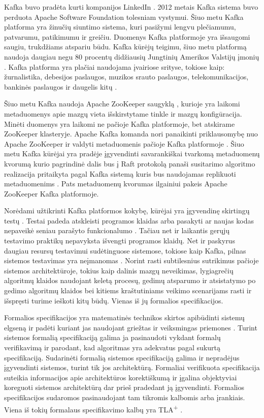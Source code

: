 \documentclass{VUMIFPSmagistrinis}
\begin{document}
 		Kafka buvo pradėta kurti kompanijos LinkedIn \cite{kfk}.
		2012 metais Kafka sistema buvo perduota Apache Software Foundation tolesniam vystymui.
		Šiuo metu Kafka platforma yra žinučių siuntimo sistema, kuri pasižymi lengvu plečiamumu, patvarumu, patikimumu ir greičiu.
		Duomenys Kafka platformoje yra išsaugomi saugiu, trukdžiams atspariu būdu.
		Kafka kūrėjų teigimu, šiuo metu platformą naudoja daugiau negu 80 procentų didžiausių Jungtinių Amerikos Valstijų įmonių \cite{kfk}.
		Kafka platforma yra plačiai naudojama įvairiose srityse, tokiose kaip: žurnalistika, debesijos paslaugos, muzikos srauto paslaugos, telekomunikacijos, bankinės paslaugos ir daugelis kitų \cite{kfk}.


		Šiuo metu Kafka naudoja Apache ZooKeeper saugyklą \cite{junqueira2013zookeeper}, kurioje yra laikomi metaduomenys apie mazgų vieta išskirstytame tinkle ir mazgų konfigūracija.
		Minėti duomenys yra laikomi ne pačioje Kafka platformoje, bet atskirame ZooKeeper klasteryje.
		Apache Kafka komanda nori panaikinti priklausomybę nuo Apache ZooKeeper ir valdyti metaduomenis pačioje Kafka platformoje \cite{metadata}.
		Šiuo metu Kafka kūrėjai yra pradėje įgyvendinti savarankiškai tvarkomą metaduomenų kvorumą kurio pagrindinė dalis bus į Raft protokolą panaši susitarimo algoritmo realizacija pritaikyta pagal Kafka sistemą kuris bus naudojamas replikuoti metaduomenims \cite{qourum}.
		Pats metaduomenų kvorumas ilgainiui pakeis Apache ZooKeeper Kafka platformoje.
		

		Norėdami užtikrinti Kafka platformos kokybę, kūrėjai yra įgyvendinę skirtingų testų \cite{kfkGH}.
		Testai padeda atskleisti programos klaidas arba pasakyti ar naujas kodas nepaveikė seniau parašyto funkcionalumo \cite{819971}.
		Tačiau net ir laikantis gerųjų testavimo praktikų nepavyksta išvengti programos klaidų.
		Net ir paskyrus daugiau resursų testavimui sudėtinguose sistemose, tokiose kaip Kafka, pilnas sistemos testavimas yra neįmanomas \cite{sullivan2004software}.
		Norint rasti subtilesnius sutrikimus pačioje sistemos architektūroje, tokius kaip dalinis mazgų neveikimas, lygiagrečių algoritmų klaidos naudojant keletą procesų, gedimų atsparumo ir atsistatymo po gedimo algoritmų klaidos bei kitiems kraštutiniams veikimo scenarijams \cite{newcombe2014use} rasti ir išspręsti turime ieškoti kitų būdų. 
		Vienas iš jų formalios specifikacijos.


		Formalios specifikacijos yra matematinės technikos skirtos apibūdinti sistemų elgseną ir padėti kuriant jas naudojant griežtas ir veiksmingas priemones \cite{holzmann1995improvement}.
		Turint sistemos formalią specifikaciją galima ja pasinaudoti vykdant formalų verifikavimą ir parodant, kad algoritmas yra adekvatus pagal sukurtą specifikaciją.
		Sudarinėti formalią sistemos specifikaciją galima ir nepradėjus įgyvendinti sistemos, turint tik jos architektūrą. 
		Formaliai verifikuota specifikacija suteikia informacijos apie architektūros korektiškumą ir įgalina objektyviai koreguoti sistemos architektūrą dar prieš pradedant ją įgyvendinti.
		Formalios specifikacijos sudaromos pasinaudojant tam tikromis kalbomis arba įrankiais.
		Viena iš tokių formalaus specifikavimo kalbų yra TLA\textsuperscript{+} \cite{lamport2002specifying}.
		
\end{document}

